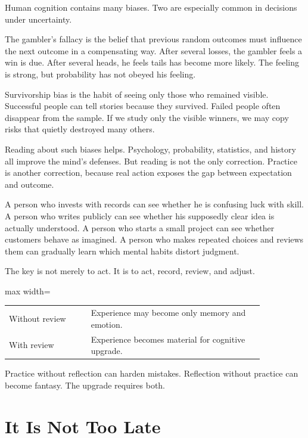 Human cognition contains many biases. Two are especially common in decisions under uncertainty.

The gambler's fallacy is the belief that previous random outcomes must influence the next outcome in a compensating way. After several losses, the gambler feels a win is due. After several heads, he feels tails has become more likely. The feeling is strong, but probability has not obeyed his feeling.

Survivorship bias is the habit of seeing only those who remained visible. Successful people can tell stories because they survived. Failed people often disappear from the sample. If we study only the visible winners, we may copy risks that quietly destroyed many others.

Reading about such biases helps. Psychology, probability, statistics, and history all improve the mind's defenses. But reading is not the only correction. Practice is another correction, because real action exposes the gap between expectation and outcome.

A person who invests with records can see whether he is confusing luck with skill. A person who writes publicly can see whether his supposedly clear idea is actually understood. A person who starts a small project can see whether customers behave as imagined. A person who makes repeated choices and reviews them can gradually learn which mental habits distort judgment.

The key is not merely to act. It is to act, record, review, and adjust.

\begin{center}
\begin{adjustbox}{max width=\linewidth}
\begin{tabular}{p{0.27\linewidth}p{0.58\linewidth}}
\hline
Without review & Experience may become only memory and emotion. \\
With review & Experience becomes material for cognitive upgrade. \\
\hline
\end{tabular}
\end{adjustbox}
\end{center}

Practice without reflection can harden mistakes. Reflection without practice can become fantasy. The upgrade requires both.

\section*{It Is Not Too Late}

